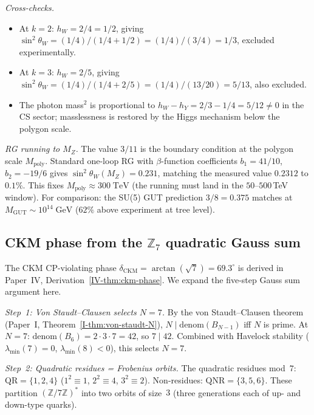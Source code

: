 \medskip\noindent
\emph{Cross-checks.}
\begin{itemize}
\item At $k = 2$: $h_W = 2/4 = 1/2$, giving
  $\sin^2\theta_W = (1/4)/(1/4 + 1/2) = (1/4)/(3/4) = 1/3$, excluded
  experimentally.
\item At $k = 3$: $h_W = 2/5$, giving
  $\sin^2\theta_W = (1/4)/(1/4 + 2/5) = (1/4)/(13/20) = 5/13$, also excluded.
\item The photon mass$^2$ is proportional to $h_W - h_Y = 2/3 - 1/4 = 5/12 \ne 0$
  in the CS sector; masslessness is restored by the
  Higgs mechanism below the polygon scale.
\end{itemize}

\medskip\noindent
\emph{RG running to $M_Z$.}
The value $3/11$ is the boundary condition at the polygon scale
$M_{\mathrm{poly}}$.
Standard one-loop RG with $\beta$-function coefficients
$b_1 = 41/10$, $b_2 = -19/6$ gives
$\sin^2\theta_W(M_Z) = 0.231$, matching the measured value
$0.2312$ to $0.1\%$.
This fixes $M_{\mathrm{poly}} \approx 300\;\mathrm{TeV}$
(the running must land in the $50$--$500$\,TeV window).
For comparison: the SU(5) GUT prediction $3/8 = 0.375$
matches at $M_{\mathrm{GUT}} \sim 10^{14}\;\mathrm{GeV}$
($62\%$ above experiment at tree level).

\subsection{CKM phase from the $\mathbb{Z}_7$ quadratic Gauss sum}
\label{sec:supp-ckm}

The CKM CP-violating phase
$\delta_{\mathrm{CKM}} = \arctan(\sqrt{7}) = 69.3^\circ$
is derived in Paper~IV, Derivation~\ref*{IV-thm:ckm-phase}.
We expand the five-step Gauss sum argument here.

\medskip\noindent
\emph{Step~1: Von Staudt--Clausen selects $N = 7$.}
By the von Staudt--Clausen theorem (Paper~I, Theorem~\ref*{I-thm:von-staudt-N}),
$N \mid \mathrm{denom}(B_{N-1})$ iff $N$ is prime.
At $N = 7$: $\mathrm{denom}(B_6) = 2 \cdot 3 \cdot 7 = 42$,
so $7 \mid 42$.
Combined with Havelock stability ($\lambda_{\min}(7) = 0$, $\lambda_{\min}(8) < 0$),
this selects $N = 7$.

\medskip\noindent
\emph{Step~2: Quadratic residues = Frobenius orbits.}
The quadratic residues mod~$7$: $\mathrm{QR} = \{1,2,4\}$
($1^2 \equiv 1$, $2^2 \equiv 4$, $3^2 \equiv 2$).
Non-residues: $\mathrm{QNR} = \{3,5,6\}$.
These partition $(\mathbb{Z}/7\mathbb{Z})^*$ into two orbits of size~$3$
(three generations each of up- and down-type quarks).

